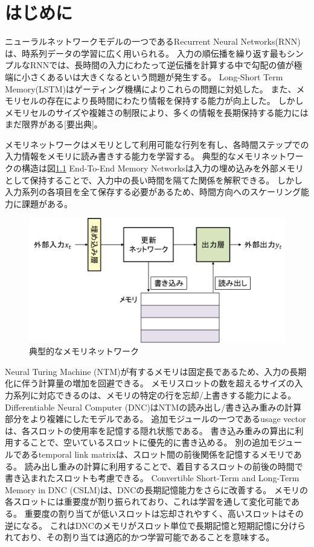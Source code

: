 \chapter{はじめに}
ニューラルネットワークモデルの一つであるRecurrent Neural Networks(RNN)は、時系列データの学習に広く用いられる。
入力の順伝播を繰り返す最もシンプルなRNNでは、長時間の入力にわたって逆伝播を計算する中で勾配の値が極端に小さくあるいは大きくなるという問題が発生する。
Long-Short Term Memory(LSTM)\cite{lstm}はゲーティング機構によりこれらの問題に対処した。
また、メモリセルの存在により長時間にわたり情報を保持する能力が向上した。
しかしメモリセルのサイズや複雑さの制限により、多くの情報を長期保持する能力にはまだ限界がある[要出典]。

メモリネットワークはメモリとして利用可能な行列を有し、各時間ステップでの入力情報をメモリに読み書きする能力を学習する。
典型的なメモリネットワークの構造は図\ref{fig:memory_net}
End-To-End Memory Networks\cite{E2E}は入力の埋め込みを外部メモリとして保持することで、入力中の長い時間を隔てた関係を解釈できる。
しかし入力系列の各項目を全て保存する必要があるため、時間方向へのスケーリング能力に課題がある。

\begin{figure}[t]
	\centering
	\includegraphics[width=\linewidth]{./figure/img_slide/memory_net.png}
	\caption{典型的なメモリネットワーク}
	\label{fig:memory_net}
\end{figure}

Neural Turing Machine (NTM)\cite{ntm}が有するメモリは固定長であるため、入力の長期化に伴う計算量の増加を回避できる。
メモリスロットの数を超えるサイズの入力系列に対応できるのは、メモリの特定の行を忘却/上書きする能力による。
Differentiable Neural Computer (DNC)\cite{dnc}はNTMの読み出し/書き込み重みの計算部分をより複雑にしたモデルである。
追加モジュールの一つであるusage vectorは、各スロットの使用率を記憶する隠れ状態である。
書き込み重みの算出に利用することで、空いているスロットに優先的に書き込める。
別の追加モジュールであるtemporal link matrixは、スロット間の前後関係を記憶するメモリである。
読み出し重みの計算に利用することで、着目するスロットの前後の時間で書き込まれたスロットも考慮できる。
Convertible Short-Term and Long-Term Memory in DNC (CSLM)\cite{cslm}は、DNCの長期記憶能力をさらに改善する。
メモリの各スロットには重要度が割り振られており、これは学習を通して変化可能である。
重要度の割り当てが低いスロットは忘却されやすく、高いスロットはその逆になる。
これはDNCのメモリがスロット単位で長期記憶と短期記憶に分けられており、その割り当ては適応的かつ学習可能であることを意味する。

